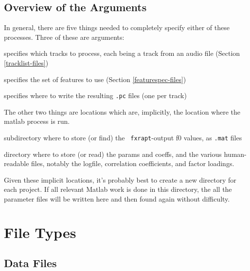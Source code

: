 \documentclass[11pt]{article}
\begin{document}
\subsection{Overview of the Arguments}   \label{arguments}

In general, there are five things needed to completely specify either
of these processes.  Three of these are arguments:

\begin{description}  \setlength{\itemsep}{0pt}\setlength{\parskip}{0pt}
\item[tracklist] specifies which tracks to process, each being a
  track from an audio file (Section \ref{tracklist-files})
\item[featurespec file]  specifies the set of features to use (Section \ref{featurespec-files})
\item[output dir] specifies where to write the resulting {\tt .pc}
  files (one per track)
\end{description}

The other two things are locations which are, implicitly, the
location where the matlab process is run. 

\begin{description}  \setlength{\itemsep}{0pt}\setlength{\parskip}{0pt}
\item[pitch cache] subdirectory where to store (or find) the {\tt
  fxrapt}-output f0 values, as {\tt .mat} files
\item[parameter dir] directory where to store (or read) the params and
  coeffs, and the various human-readable files, notably the logfile,
  correlation coefficients, and factor loadings.

\end{description}

Given these implicit locations, it's probably best to create a new
directory for each project.  If all relevant Matlab work is done in
this directory, the all the parameter files will be written here and
then found again without difficulty.  


\section{File Types}       

\subsection{Data Files}
\end{document}
